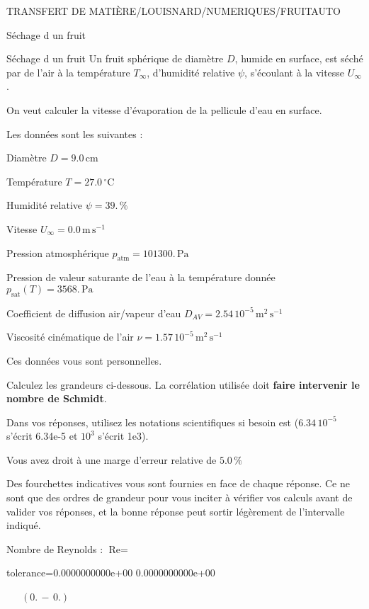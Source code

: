 \documentclass[12pt]{article}
\begin{document}
\begin{quiz}{TRANSFERT DE MATIÈRE/LOUISNARD/NUMERIQUES/FRUITAUTO}
\begin{cloze}{Séchage d un fruit}
\end{cloze} 


 \begin{cloze}{Séchage d un fruit} 
Un fruit sphérique de diamètre $D$, humide en surface, est séché par de l'air à la température $T_\infty$, d'humidité relative $\psi$, s'écoulant à la vitesse $U_\infty$.

On veut calculer la vitesse d'évaporation de la pellicule d'eau en surface.

 

Les données sont les suivantes :

 

Diamètre $D = 9.0\,  \mathrm{cm} $

Température $T = 27.0\,  \mathrm{^\circ\mathrm{C}} $

Humidité relative $\psi = 39.\, \% $

Vitesse $U_\infty = 0.0\,  \mathrm{m}\,  \mathrm{s}^{-1} $

Pression atmosphérique $p_{\text{atm}} = 101300.\,  \mathrm{Pa} $

Pression de valeur saturante de l’eau à la température donnée $p_{\text{sat}}(T) = 3568.\,  \mathrm{Pa} $

Coefficient de diffusion air/vapeur d’eau $D_{AV} =  2.54 \, 10^{-5} \,  \mathrm{m}^{2}\,  \mathrm{s}^{-1} $

Viscosité cinématique de l’air $\nu =  1.57 \, 10^{-5} \,  \mathrm{m}^{2}\,  \mathrm{s}^{-1} $

Ces données vous sont personnelles.

 

Calculez les grandeurs ci-dessous. La corrélation utilisée doit \textbf{faire intervenir le nombre de Schmidt}.

Dans vos réponses, utilisez les notations scientifiques si besoin est ($6.34\, 10^{-5}$ s'écrit 6.34e-5 et $10^{3}$ s'écrit 1e3).

Vous avez droit à une marge d'erreur relative de $5.0\, \% $

Des fourchettes indicatives vous sont fournies en face de chaque réponse. Ce ne sont que des ordres de grandeur pour vous inciter à vérifier vos calculs avant de valider vos réponses, et la bonne réponse peut sortir légèrement de l'intervalle indiqué.

 

Nombre de Reynolds : $\text{Re} =  $
\begin{numerical}[points=1] 
\item[tolerance={0.0000000000e+00}] 0.0000000000e+00 
\end{numerical} 
 $\,$ 
 $ \quad (0. \, - \, 0.) $ 


\end{cloze}
\end{quiz}
\end{document}
